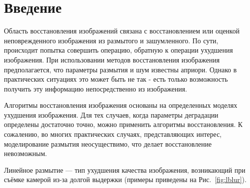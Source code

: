 

\usepackage{comment}





\tableofcontents

\newpage

\pagestyle{fancy}

\rhead{\thepage}
\fancyfoot{}

\section{Введение}

Область восстановления изображений связана с восстановлением или оценкой неповрежденного
изображения из размытого и зашумленного. По сути, происходит попытка совершить операцию, обратную к операции ухудшения изображения. При использовании методов восстановления изображения предполагается, что параметры размытия и шум известны априори. Однако в практических ситуациях это может быть не так - есть только возможность получить эту информацию непосредственно из изображения. 

Алгоритмы восстановления изображения основаны на определенных моделях ухудшения изображения.
Для тех случаев, когда параметры деградации определены достаточно точно, можно применить алгоритмы восстановления. К сожалению, во многих практических случаях, представляющих интерес,
моделирование размытия неосуществимо, что делает восстановление невозможным. 

Линейное размытие --- тип ухудшения качества изображения, возникающий при съёмке камерой из-за долгой выдержки (примеры приведены на Рис.~\ref{fig:lblur}).

